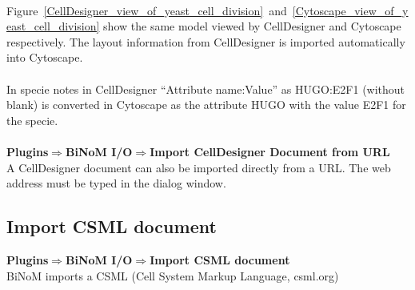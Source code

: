\\Figure~\ref{CellDesigner_view_of_yeast_cell_division}~and~\ref{Cytoscape_view_of_yeast_cell_division} show the same model viewed by CellDesigner and Cytoscape respectively. The layout information from CellDesigner is imported automatically into Cytoscape.\\\\
In specie notes in CellDesigner “Attribute name:Value” as HUGO:E2F1 (without blank) is converted in Cytoscape as the attribute HUGO with the value E2F1 for the specie.\\\\
\textbf{Plugins$\Rightarrow$BiNoM I/O$\Rightarrow$Import CellDesigner Document from URL}\\
A CellDesigner document can also be imported directly from a URL. The web address must be typed in the dialog window.

\subsection{Import CSML document}
\textbf{Plugins$\Rightarrow$BiNoM I/O$\Rightarrow$Import CSML document}\\
BiNoM imports a CSML (Cell System Markup Language, csml.org)

